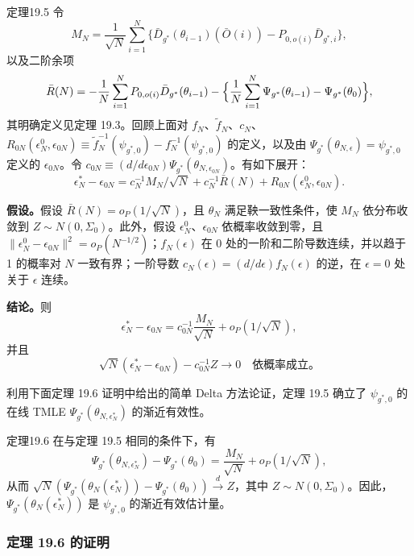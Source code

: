 \begin{bookresult}{定理}{19.5}
令
\[
 M_N=\frac1{\sqrt N}\sum_{i=1}^N
 \{\bar D_{g^*}(\theta_{i-1})(\bar O(i))-P_{0,o(i)}\bar D_{g^*,i}\},
\]
以及二阶余项
\[
 \bar R(N)=-\frac1N\sum_{i=1}^N P_{0,o(i)}\bar D_{g^*}(\theta_{i-1})
 -\Bigl\{\frac1N\sum_{i=1}^N\Psi_{g^*}(\theta_{i-1})-\Psi_{g^*}(\theta_0)\Bigr\},
\]
其明确定义见定理 19.3。回顾上面对 $f_N$、$\tilde f_N$、$c_N$、$R_{0N}(\epsilon_N^0,\epsilon_{0N})\equiv\tilde f_N^{-1}(\psi_{g^*,0})-f_N^{-1}(\psi_{g^*,0})$ 的定义，以及由 $\Psi_{g^*}(\theta_{N,\epsilon})=\psi_{g^*,0}$ 定义的 $\epsilon_{0N}$。令 $c_{0N}\equiv({d}/{d\epsilon_{0N}})\Psi_{g^*}(\theta_{N,\epsilon_{0N}})$。有如下展开：
\begin{equation}
 \epsilon_N^*-\epsilon_{0N}=c_N^{-1}M_N/\sqrt N
 +c_N^{-1}\bar R(N)+R_{0N}(\epsilon_N^0,\epsilon_{0N}).
 \tag{19.7}
\end{equation}

\textbf{假设。}假设 $\bar R(N)=o_P(1/\sqrt N)$，且 $\theta_N$ 满足鞅一致性条件，使 $M_N$ 依分布收敛到 $Z\sim N(0,\Sigma_0)$。此外，假设 $\epsilon_N^0$、$\epsilon_{0N}$ 依概率收敛到零，且 $\|\epsilon_N^0-\epsilon_{0N}\|^2=o_P(N^{-1/2})$；$f_N(\epsilon)$ 在 0 处的一阶和二阶导数连续，并以趋于 1 的概率对 $N$ 一致有界；一阶导数 $c_N(\epsilon)=({d}/{d\epsilon})f_N(\epsilon)$ 的逆，在 $\epsilon=0$ 处关于 $\epsilon$ 连续。

\textbf{结论。}则
\[
 \epsilon_N^*-\epsilon_{0N}=c_{0N}^{-1}\frac{M_N}{\sqrt N}+o_P(1/\sqrt N),
\]
并且
\[
 \sqrt N(\epsilon_N^*-\epsilon_{0N})-c_{0N}^{-1}Z\to0
 \quad\text{依概率成立。}
\]
\end{bookresult}

利用下面定理 19.6 证明中给出的简单 Delta 方法论证，定理 19.5 确立了 $\psi_{g^*,0}$ 的在线 TMLE $\Psi_{g^*}(\theta_{N,\epsilon_N^*})$ 的渐近有效性。

\begin{bookresult}{定理}{19.6}
在与定理 19.5 相同的条件下，有
\[
 \Psi_{g^*}(\theta_{N,\epsilon_N^*})-\Psi_{g^*}(\theta_0)
 =\frac{M_N}{\sqrt N}+o_P(1/\sqrt N),
\]
从而 $\sqrt N(\Psi_{g^*}(\theta_N(\epsilon_N^*))-\Psi_{g^*}(\theta_0))\xrightarrow{d}Z$，其中 $Z\sim N(0,\Sigma_0)$。因此，$\Psi_{g^*}(\theta_N(\epsilon_N^*))$ 是 $\psi_{g^*,0}$ 的渐近有效估计量。
\end{bookresult}

\subsubsection*{定理 19.6 的证明}

